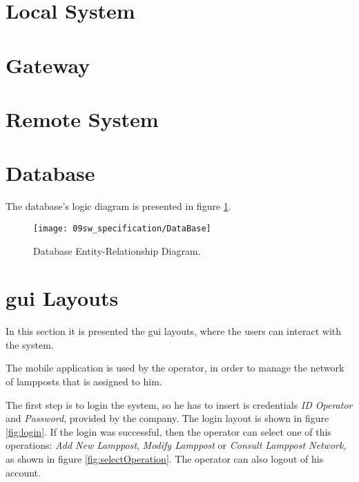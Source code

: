 \section{Local System}


\clearpage
\section{Gateway}


\clearpage
\section{Remote System}


\clearpage
\section{Database}
The database's logic diagram is presented in figure \ref{fig:database_er}.

\begin{figure}[H]
	\centering	
	\texttt{[image: 09sw\_specification/DataBase]}
	\caption{Database Entity-Relationship Diagram.}
	\label{fig:database_er}
\end{figure}



\clearpage
\section{\ac{gui} Layouts}
In this section it is presented the \ac{gui} layouts, where the users can interact with the system.


The mobile application is used by the operator, in order to manage the network of lampposts that is assigned to him. 

The first step is to login the system, so he has to insert is credentials \textit{ID Operator} and \textit{Password}, provided by the company. The login layout is shown in figure \ref{fig:login}. If the login was successful, then the operator can select one of this operations: \textit{Add New Lamppost}, \textit{Modify Lamppost} or \textit{Consult Lamppost Network}, as shown in figure \ref{fig:selectOperation}. The operator can also logout of his account.


